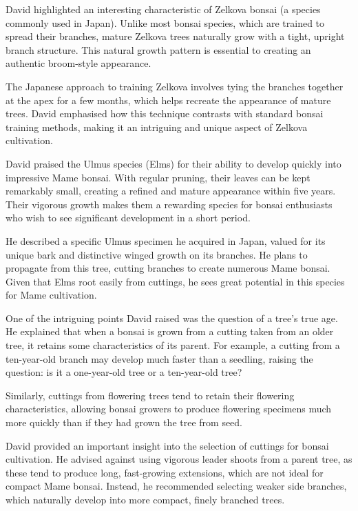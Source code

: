 \medskip

\noindent
David highlighted an interesting characteristic of Zelkova bonsai (a species commonly used in Japan). Unlike most bonsai species, which are trained to spread their branches, mature Zelkova trees naturally grow with a tight, upright branch structure. This natural growth pattern is essential to creating an authentic broom\--style appearance.

The Japanese approach to training Zelkova involves tying the branches together at the apex for a few months, which helps recreate the appearance of mature trees. David emphasised how this technique contrasts with standard bonsai training methods, making it an intriguing and unique aspect of Zelkova cultivation.

\medskip

\noindent
David praised the Ulmus species (Elms) for their ability to develop quickly into impressive Mame bonsai. With regular pruning, their leaves can be kept remarkably small, creating a refined and mature appearance within five years. Their vigorous growth makes them a rewarding species for bonsai enthusiasts who wish to see significant development in a short period.

He described a specific Ulmus specimen he acquired in Japan, valued for its unique bark and distinctive winged growth on its branches. He plans to propagate from this tree, cutting branches to create numerous Mame bonsai. Given that Elms root easily from cuttings, he sees great potential in this species for Mame cultivation.

\medskip

\noindent
One of the intriguing points David raised was the question of a tree's true age. He explained that when a bonsai is grown from a cutting taken from an older tree, it retains some characteristics of its parent. For example, a cutting from a ten\--year\--old branch may develop much faster than a seedling, raising the question: is it a one\--year\--old tree or a ten\--year\--old tree? 

Similarly, cuttings from flowering trees tend to retain their flowering characteristics, allowing bonsai growers to produce flowering specimens much more quickly than if they had grown the tree from seed.

\medskip

\noindent
David provided an important insight into the selection of cuttings for bonsai cultivation. He advised against using vigorous leader shoots from a parent tree, as these tend to produce long, fast\--growing extensions, which are not ideal for compact Mame bonsai. Instead, he recommended selecting weaker side branches, which naturally develop into more compact, finely branched trees.

